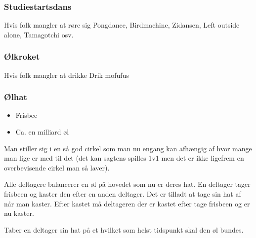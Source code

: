 \documentclass[../../../main.tex]{subfiles}
\begin{document}
\begin{multicols}{2}
\subsubsection*{Studiestartsdans}{Hvis folk mangler at røre sig}
    Pongdance, Birdmachine, Zidansen, Left outside alone, Tamagotchi osv.
    
\subsubsection*{Ølkroket}{Hvis folk mangler at drikke}
    Drik mofufus \\



\subsubsection*{Ølhat}
\begin{itemize}
    \item Frisbee
    \item Ca. en milliard øl
\end{itemize}

Man stiller sig i en så god cirkel som man nu engang kan afhængig af hvor mange man lige er med til det (det kan sagtens spilles 1v1 men det er ikke ligefrem en overbevisende cirkel man så laver). 

Alle deltagere balancerer en øl på hovedet som nu er deres hat. En deltager tager frisbeen og kaster den efter en anden deltager. Det er tilladt at tage sin hat af når man kaster. Efter kastet må deltageren der er kastet efter tage frisbeen og er nu kaster. 

Taber en deltager sin hat på et hvilket som helst tidspunkt skal den øl bundes.

\end{multicols}
\end{document}
